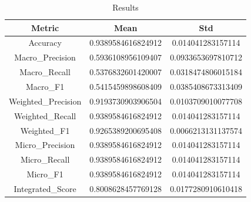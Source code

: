 \begin{table}[htbp]
\centering
\caption{Results}
\label{tab:csv}
\small
\setlength{\tabcolsep}{4pt}
\begin{tabular}{|c|c|c|}
\hline
Metric & Mean & Std \\
\hline
Accuracy & 0.9389584616824912 & 0.014041283157114 \\
Macro_Precision & 0.5936108956109407 & 0.0933653697810712 \\
Macro_Recall & 0.5376832601420007 & 0.0318474806015184 \\
Macro_F1 & 0.5415459898608409 & 0.0385408673313409 \\
Weighted_Precision & 0.9193730903906504 & 0.0103709010077708 \\
Weighted_Recall & 0.9389584616824912 & 0.014041283157114 \\
Weighted_F1 & 0.9265389200695408 & 0.0066213131137574 \\
Micro_Precision & 0.9389584616824912 & 0.014041283157114 \\
Micro_Recall & 0.9389584616824912 & 0.014041283157114 \\
Micro_F1 & 0.9389584616824912 & 0.014041283157114 \\
Integrated_Score & 0.8008628457769128 & 0.0177280910610418 \\
\hline
\end{tabular}
\end{table}